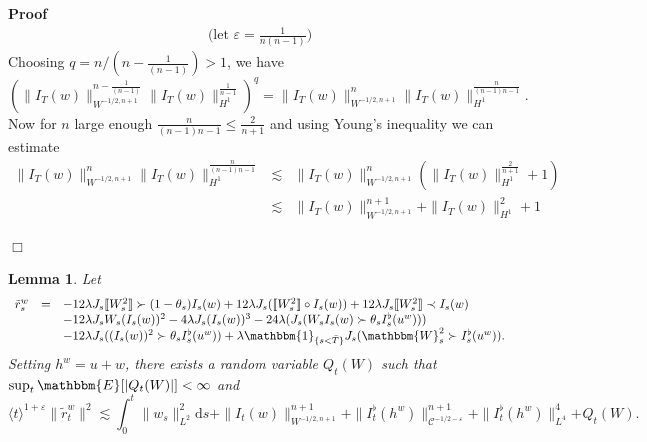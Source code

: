 \documentclass[11pt]{article}
\newcommand{\mathd}{\mathrm{d}}
\newenvironment{proof}{\noindent\textbf{Proof\ }}{\hspace*{\fill}$\Box$\medskip}
\newtheorem{lemma}{Lemma}
\newcommand{\VV}{\mathscr{C}}
\begin{document}
\begin{proof}
\[\begin{array}{lll}
       \text{(let $\varepsilon = \tfrac{1}{n (n - 1)}$)}
     \end{array} \]
  Choosing $q = n / \left( n - \frac{1}{(n - 1)} \right) > 1$, we have
  \[ \left( \| I_T (w) \|_{W^{- 1 / 2, n + 1}}^{n - \frac{1}{(n - 1)}} \|
     I_T (w) \|^{\frac{1}{n - 1}}_{H^1} \right)^q = \| I_T (w) \|_{W^{- 1 / 2,
     n + 1}}^n \| I_T (w) \|^{\frac{n}{(n - 1) n - 1}}_{H^1} . \]
  Now for $n$ large enough $\frac{n}{(n - 1) n - 1} \leqslant \frac{2}{n + 1}$
  and using Young's inequality we can estimate
  \[ \begin{array}{lll}
       \| I_T (w) \|_{W^{- 1 / 2, n + 1}}^n \| I_T (w) \|^{\frac{n}{(n - 1)
       n - 1}}_{H^1} & \lesssim & \| I_T (w) \|_{W^{- 1 / 2, n + 1}}^n
       \left( \| I_T (w) \|^{\frac{2}{n + 1}}_{H^1} + 1 \right)\\
       & \lesssim & \| I_T (w) \|_{W^{- 1 / 2, n + 1}}^{n + 1} + \| I_T
       (w) \|^2_{H^1} + 1
     \end{array} \]
  
\end{proof}

\begin{lemma}
  \label{lemma:estimateremainder}Let
  \[ \begin{array}{lll}
       \tilde{r}_s^w & = & - 12 \lambda J_s \llbracket W_s^2 \rrbracket \succ
       (1 - \theta_s) I_s (w) + 12 \lambda J_s (\llbracket W_s^2 \rrbracket
       \circ I_s (w)) + 12 \lambda J_s \llbracket W_s^2 \rrbracket \prec I_s
       (w)\\
       &  & - 12 \lambda J_s W_s (I_s (w))^2 - 4 \lambda J_s (I_s (w))^3 - 24
       \lambda (J_s (W_s I_s (w) \succ \theta_s I^{\flat}_s (u^w)))\\
       &  & - 12 \lambda J_s ((I_s (w))^2 \succ \theta_s I^{\flat}_s (u^w)) +
       \lambda \mathbbm{1}_{\{ s < \bar{T} \}} J_s (\mathbbm{W}_s^2 \succ
       I_s^{\flat} (u^w)) .
     \end{array} \]
  Setting $h^w = u + w$, there exists a random variable $Q_t (W)$ such that
  $\sup_t \mathbbm{E} [| Q_t (W) |] < \infty$ and
  \[ \langle t \rangle^{1 + \varepsilon} \| \tilde{r}_t^w \|^2 \lesssim
     \int^t_0 \| w_s \|_{L^2}^2 \mathd s + \| I_t (w) \|^{n + 1}_{W^{- 1 / 2,
     n + 1}} + \|I_t^{\flat} (h^w) \|^{n + 1}_{\VV^{- 1 / 2 - \varepsilon}} +
     \| I^{\flat}_t (h^w) \|^4_{L^4} +_{} Q_t (W) . \]
\end{lemma}
\end{document}
